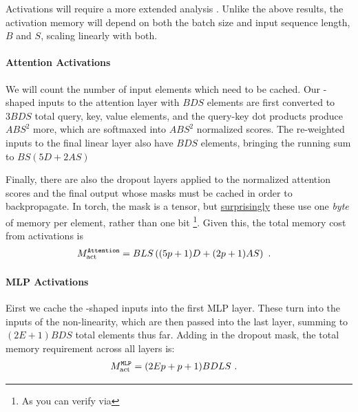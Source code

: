\documentclass[11pt]{article}
\begin{document}
Activations will require a more extended analysis \cite{korthikanti2022reducing}. Unlike the above
results, the activation memory will depend on both the batch size and input sequence length, $ B $
and $ S $, scaling linearly with both.



\paragraph{Attention Activations}

We will count the number of input elements which need to be cached. Our -shaped inputs
to the attention layer with $ BDS $ elements are first converted to $ 3BDS $ total query, key, value
elements, and the query-key dot products produce $ ABS ^{ 2 } $ more, which are softmaxed into $ ABS
^{ 2 } $ normalized scores. The re-weighted inputs to the final linear layer also have $ BDS $
elements, bringing the running sum to $ BS \left ( 5D + 2AS  \right ) $

Finally, there are also the dropout layers applied to the normalized attention scores and the final
output whose masks must be cached in order to
backpropagate. In torch, the mask is a  tensor, but
\href{https://github.com/pytorch/pytorch/issues/41571}{surprisingly} these use one \textit{byte} of
memory per element, rather than one bit \footnote{As you can verify
via }.
Given this, the total memory cost from activations is
\begin{align}
M _{ \rm act  } ^\texttt{Attention} &= BLS \left ( (5p+1)D + (2p+1)AS  \right ) \ .
\label{eq_att_actmem_vanilla}
\end{align}




\paragraph{MLP Activations}

  Eirst we cache the
-shaped inputs into the first MLP layer. These turn into the
 inputs of the non-linearity, which are then passed into the last
 layer, summing to $ (2E+1)BDS $ total elements thus far. Adding in the dropout
mask, the total memory requirement across all  layers is:
\begin{align}
M _{ \rm act  } ^\texttt{MLP} &= (2Ep+p+1)BDLS\ .
\label{eq_mlp_actmem_vanilla}
\end{align}
\end{document}
